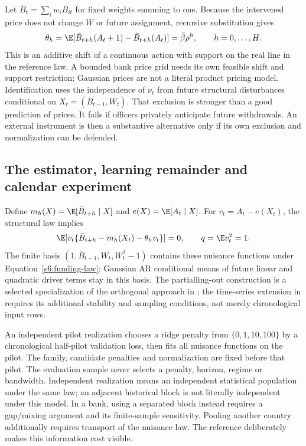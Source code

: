 Let $\bar B_t=\sum_iw_iB_{it}$ for fixed weights summing to one. Because
the intervened price does not change $W$ or future assignment, recursive
substitution gives
\[
 \theta_h=\E[\bar B_{t+h}(A_t+1)-\bar B_{t+h}(A_t)]
       =\bar\beta\rho^h,\qquad h=0,\ldots,H.
\]
This is an additive shift of a continuous action with support on the real
line in the reference law. A bounded bank price grid needs its own feasible
shift and support restriction; Gaussian prices are not a literal product
pricing model. Identification uses the independence of $\nu_t$ from future
structural disturbances conditional on
$X_t=(\bar B_{t-1},W_t)$. That exclusion is stronger than a good prediction
of prices. It fails if officers privately anticipate future withdrawals.
An external instrument is then a substantive alternative only if its own
exclusion and normalization can be defended.

\subsection{The estimator, learning remainder and calendar experiment}
Define $m_h(X)=\E[\bar B_{t+h}\mid X]$ and $e(X)=\E[A_t\mid X]$.
For $v_t=A_t-e(X_t)$, the structural law implies
\[
 \E[v_t\{\bar B_{t+h}-m_h(X_t)-\theta_hv_t\}]=0,
 \qquad q=\E v_t^2=1.
\]
The finite basis $(1,\bar B_{t-1},W_t,W_t^2-1)$ contains these nuisance
functions under Equation~\eqref{s6:funding-law}: Gaussian AR conditional
means of future linear and quadratic driver terms stay in this basis.
The partialling-out construction is a selected specialization of the
orthogonal approach in \citet{dml2018}; the time-series extension in
\citet{ciganovic2026} requires its additional stability and sampling
conditions, not merely chronological input rows.

An independent pilot realization chooses a ridge penalty from
$\{0,1,10,100\}$ by a chronological half-pilot validation loss, then fits
all nuisance functions on the pilot. The family, candidate penalties and
normalization are fixed before that pilot. The evaluation sample never
selects a penalty, horizon, regime or bandwidth. Independent realization
means an independent statistical population under the same law; an adjacent
historical block is not literally independent under this model. In a bank,
using a separated block instead requires a gap/mixing argument and its
finite-sample sensitivity. Pooling another country additionally requires
transport of the nuisance law. The reference deliberately makes this
information cost visible.

